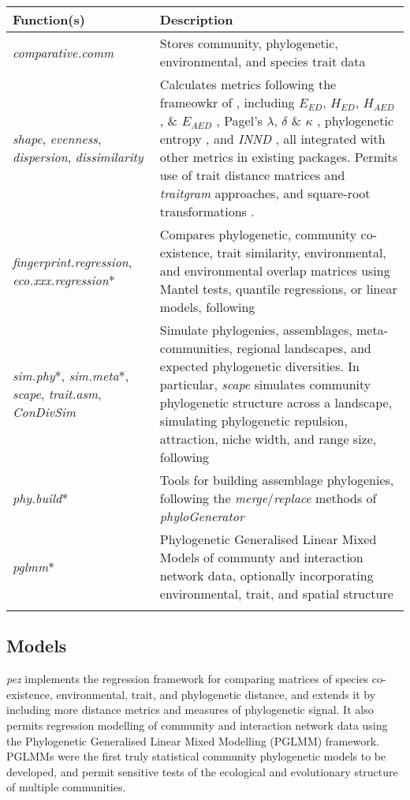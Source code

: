 \documentclass{bioinfo}
\begin{document}
\begin{table*}
  {\begin{tabular}{p{3cm} p{14cm}}\toprule
      Function(s) & Description\\\midrule
      \emph{comparative.comm} & Stores community, phylogenetic, environmental, and species trait data\\
      \emph{shape}, \emph{evenness}, \emph{dispersion}, \emph{dissimilarity} & Calculates metrics following the frameowkr of \citet{Pearse2014review}, including $E_{ED}$, $H_{ED}$, $H_{AED}$, \& $E_{AED}$ \citep{Cadotte2010}, Pagel's $\lambda$, $\delta$ \& $\kappa$ \citep{Pagel1999}, phylogenetic entropy \citep{Allen2009}, and \emph{INND} \citep{Ness2011}, all integrated with other metrics in existing packages. Permits use of trait distance matrices and \emph{traitgram} \citep{Ackerly2009,Cadotte2013} approaches, and square-root transformations \citep[following][]{Letten2014}.\\
      \emph{fingerprint.regression}, \emph{eco.xxx.regression}* & Compares phylogenetic, community co-existence, trait similarity, environmental, and environmental overlap matrices using Mantel tests, quantile regressions, or linear models, following \citet{Cavender-Bares2004} \\
      \emph{sim.phy}*, \emph{sim.meta}*, \emph{scape}, \emph{trait.asm}, \emph{ConDivSim} & Simulate phylogenies, assemblages, meta-communities, regional landscapes, and expected phylogenetic diversities. In particular, \emph{scape} simulates community phylogenetic structure across a landscape, simulating phylogenetic repulsion, attraction, niche width, and range size, following \citet{Helmus2012}\\
      \emph{phy.build}* & Tools for building assemblage phylogenies, following the \emph{merge}/\emph{replace} methods of \emph{phyloGenerator} \citep{Pearse2013}\\
      \emph{pglmm}* & Phylogenetic Generalised Linear Mixed Models of communty \citep{Ives2011} and interaction network \citep{Rafferty2013} data, optionally incorporating environmental, trait, and spatial structure\\
      \botrule
\end{tabular}}{}
\end{table*}
\subsection{Models}
\emph{pez} implements the \citet{Cavender-Bares2004} regression
framework for comparing matrices of species co-existence,
environmental, trait, and phylogenetic distance, and extends it by
including more distance metrics and measures of phylogenetic
signal. It also permits regression modelling of community
\citep{Ives2011} and interaction network data \citep{Rafferty2013}
using the Phylogenetic Generalised Linear Mixed Modelling (PGLMM)
framework. PGLMMs were the first truly statistical community
phylogenetic models to be developed, and permit sensitive tests of the
ecological and evolutionary structure of multiple communities.
\end{document}
